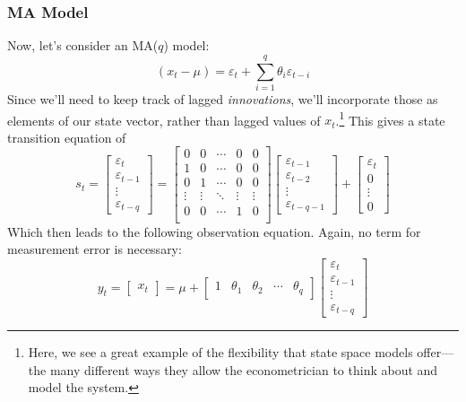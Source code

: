 \documentclass[a4paper,12pt]{article}
\begin{document}
\subsubsection{MA Model}

Now, let's consider an MA($q$) model:
\[
  (x_t - \mu) = \varepsilon_t
  + \sum^q_{i=1} \theta_i  \varepsilon_{t-i}
\]
Since we'll need to keep track of lagged \emph{innovations}, we'll incorporate those as elements of our state vector, rather than lagged values of $x_t$.\footnote{Here, we see a great example of the flexibility that state space models offer---the many different ways they allow the econometrician to think about and model the system.} This gives a state transition equation of
\[
  s_t =
  \begin{bmatrix}
  \varepsilon_t \\ \varepsilon_{t-1} \\
  \vdots \\ \varepsilon_{t-q}
  \end{bmatrix}
  = \begin{bmatrix}
  0 & 0 & \cdots & 0 & 0 \\
  1 & 0 & \cdots & 0 & 0\\
  0 & 1 & \cdots & 0 & 0\\
  \vdots & \vdots & \ddots & \vdots & \vdots\\
  0 & 0 & \cdots & 1 & 0\\
  \end{bmatrix}
  \begin{bmatrix}
  \varepsilon_{t-1} \\ \varepsilon_{t-2} \\
  \vdots \\ \varepsilon_{t-q-1}
  \end{bmatrix}
  + \begin{bmatrix}
  \varepsilon_t \\ 0 \\ \vdots \\ 0
  \end{bmatrix}
\]
Which then leads to the following observation equation. Again, no term for measurement error is necessary:
\[
  y_t =
  \begin{bmatrix} x_t \end{bmatrix}
  = \mu +
  \begin{bmatrix} 1 & \theta_1 & \theta_2 & \cdots &
    \theta_q \end{bmatrix}
  \begin{bmatrix}
  \varepsilon_t \\ \varepsilon_{t-1} \\
  \vdots \\ \varepsilon_{t-q}
  \end{bmatrix}
\]
\end{document}

